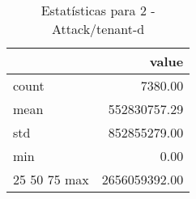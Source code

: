 \begin{table}[htbp]
\caption{Estatísticas para 2 - Attack/tenant-d}
\label{tab:2_-_attack_tenant-d_summary}
\begin{tabular}{lr}
\toprule
 & value \\
\midrule
count & 7380.00 \\
mean & 552830757.29 \\
std & 852855279.00 \\
min & 0.00 \\
25%
50%
75%
max & 2656059392.00 \\
\bottomrule
\end{tabular}
\end{table}
